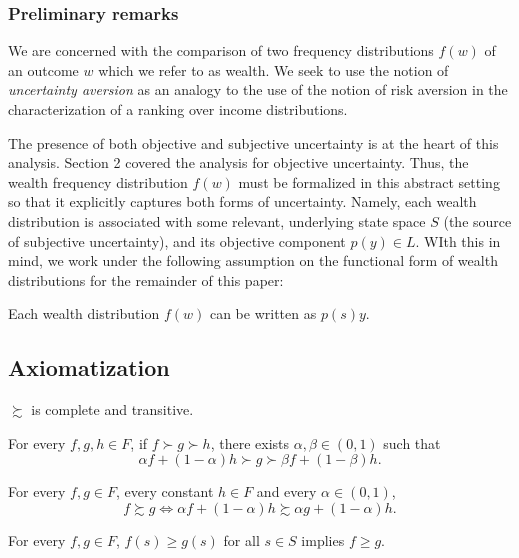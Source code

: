 \documentclass[\econtexRoot/IneqMeas]{subfiles}
\begin{document}
\subsubsection*{Preliminary remarks}

We are concerned with the comparison of two frequency distributions $f(w)$ of an outcome $w$ which we refer to as wealth. We seek to use the notion of \textit{uncertainty aversion} as an analogy to the use of the notion of risk aversion in the characterization of a ranking over income distributions.

The presence of both objective and subjective uncertainty is at the heart of this analysis. Section 2 covered the analysis for objective uncertainty. Thus, the wealth frequency distribution $f(w)$ must be formalized in this abstract setting so that it explicitly captures both forms of uncertainty. Namely, each wealth distribution is associated with some relevant, underlying state space $S$ (the source of subjective uncertainty), and its objective component $p(y) \in L$. WIth this in mind, we work under the following assumption on the functional form of wealth distributions for the remainder of this paper:

\begin{assu}
Each wealth distribution $f(w)$ can be written as $p(s)y$.
\end{assu}


\subsection{Axiomatization}

\begin{ax.AA}
$\succsim$ is complete and transitive.
\end{ax.AA}

\begin{ax.AA}[Continuity]
For every $f,g,h \in F$,  if $f \succ g \succ h $, there exists $\alpha, \beta \in (0,1)$ such that 
$$ \alpha f + (1-\alpha) h \succ g \succ \beta f + (1-\beta) h .$$ 
\end{ax.AA}

\begin{ax.C}[C-Independence]
For every $f,g \in F$, every constant $h \in F$ and every $\alpha \in (0,1)$,
$$ f \succsim g \iff \alpha f + (1-\alpha)h \succsim \alpha g + (1-\alpha)h. $$
\end{ax.C}

\begin{ax.AA}[Monotonicity]
For every $f,g \in F$, $f(s) \geq g(s)$ for all $s \in S$ implies $f \geq g$.
\end{ax.AA}
\end{document}

